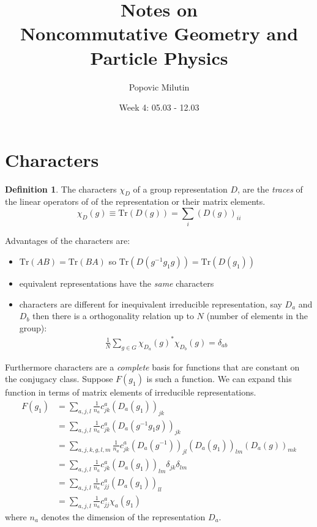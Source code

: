 \documentclass[a4paper]{article}
\title{Notes on \\ Noncommutative Geometry and Particle Physics}
\author{Popovic Milutin}
\date{Week 4: 05.03 - 12.03}
\theoremstyle{definition}
\newtheorem{definition}{Definition}
\theoremstyle{definition}
\theoremstyle{definition}
\theoremstyle{theorem}
\theoremstyle{theorem}
\theoremstyle{definition}
\begin{document}
\maketitle
\tableofcontents

\section{Characters}
\begin{definition}
    The characters $\chi _D$ of a group representation $D$, are the \textit{traces} of the linear operators
    of of the representation or their matrix elements.
    \begin{equation}
        \chi _D (g) \equiv \text{Tr}(D(g)) = \sum _i (D(g))_{ii}
    \end{equation}
\end{definition}
Advantages of the characters are:
\begin{itemize}
    \item $\text{Tr}(AB) = \text{Tr}(BA)$ so $\text{Tr}(D(g^{-1}g_1g)) = \text{Tr}(D(g_1))$
    \item equivalent representations have the \textit{same} characters
    \item characters are different for inequivalent irreducible representation,
        say $D_a$ and $D_b$ then there is a orthogonality relation up to $N$
        (number of elements in the group):
        \begin{align}
            \frac{1}{N} \sum _{g\in G} \chi _{D_a}(g)^*\chi_{D_b}(g) = \delta _{ab}
        \end{align}
\end{itemize}
Furthermore characters are a \textit{complete} basis for functions that are constant on the conjugacy
    class. Suppose $F(g_1)$ is such a function. We can expand this function in terms of matrix elements
    of irreducible representations.
    \begin{align}
        F(g_1) &= \sum_{a,j,l}\frac{1}{n_a} c_{jk}^{a} (D_a(g_1))_{jk}  \\
                &= \sum_{a,j,l}\frac{1}{n_a} c_{jk}^{a} (D_a(g^{-1}g_1g))_{jk}  \\
                &= \sum_{a,j,k,g,l,m}\frac{1}{n_a} c_{jk}^{a} (D_a(g^{-1}))_{jl}(D_a(g_1))_{lm}(D_a(g))_{mk} \\
                &= \sum_{a,j,l}\frac{1}{n_a} c_{jk}^{a} (D_a(g_1))_{lm} \delta _{jk} \delta _{lm} \\
                &= \sum_{a,j,l}\frac{1}{n_a} c_{jj}^{a} (D_a(g_1))_{ll}  \\
                &= \sum_{a,j,l}\frac{1}{n_a} c_{jj}^{a} \chi _a (g_1)
    \end{align}
where $n_a$ denotes the dimension of the representation $D_a$.
\newline
\end{document}
